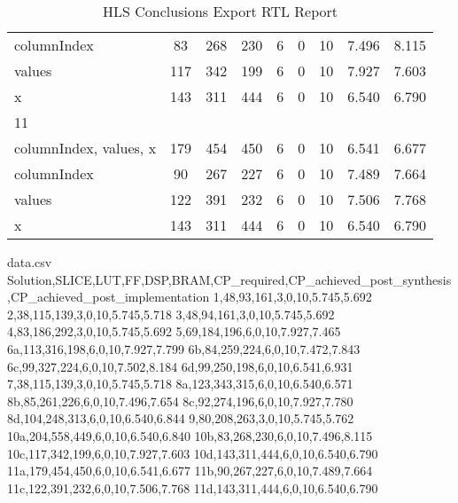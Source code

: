 \begin{table}[H]
\begin{tabular}{|l|c|c|c|c|c|c|c|c|}
		\tabitem columnIndex & 83 & 268 & 230 & 6 & 0 & 10 & 7.496 & 8.115 \\
		\tabitem values & 117 & 342 & 199 & 6 & 0 & 10 & 7.927 & 7.603 \\
		\tabitem x & 143 & 311 & 444 & 6 & 0 & 10 & 6.540 & 6.790 \\
		\hline
		11 &  &  &  &  &  &  &  &  \\
		\tabitem columnIndex, values, x & 179 & 454 & 450 & 6 & 0 & 10 & 6.541 & 6.677 \\
		\tabitem columnIndex & 90 & 267 & 227 & 6 & 0 & 10 & 7.489 & 7.664 \\
		\tabitem values & 122 & 391 & 232 & 6 & 0 & 10 & 7.506 & 7.768 \\
		\tabitem x & 143 & 311 & 444 & 6 & 0 & 10 & 6.540 & 6.790 \\
		\hline
	\end{tabular}
	\caption{HLS Conclusions Export RTL Report}
	\label{tab:hls-conclusions-export-rtl-report}
\end{table}




\begin{filecontents}{data.csv}
	Solution,SLICE,LUT,FF,DSP,BRAM,CP\_required,CP\_achieved\_post\_synthesis,CP\_achieved\_post\_implementation
	1,48,93,161,3,0,10,5.745,5.692
	2,38,115,139,3,0,10,5.745,5.718
	3,48,94,161,3,0,10,5.745,5.692
	4,83,186,292,3,0,10,5.745,5.692
	5,69,184,196,6,0,10,7.927,7.465
	6a,113,316,198,6,0,10,7.927,7.799
	6b,84,259,224,6,0,10,7.472,7.843
	6c,99,327,224,6,0,10,7.502,8.184
	6d,99,250,198,6,0,10,6.541,6.931
	7,38,115,139,3,0,10,5.745,5.718
	8a,123,343,315,6,0,10,6.540,6.571
	8b,85,261,226,6,0,10,7.496,7.654
	8c,92,274,196,6,0,10,7.927,7.780
	8d,104,248,313,6,0,10,6.540,6.844
	9,80,208,263,3,0,10,5.745,5.762
	10a,204,558,449,6,0,10,6.540,6.840
	10b,83,268,230,6,0,10,7.496,8.115
	10c,117,342,199,6,0,10,7.927,7.603
	10d,143,311,444,6,0,10,6.540,6.790
	11a,179,454,450,6,0,10,6.541,6.677
	11b,90,267,227,6,0,10,7.489,7.664
	11c,122,391,232,6,0,10,7.506,7.768
	11d,143,311,444,6,0,10,6.540,6.790
\end{filecontents}


